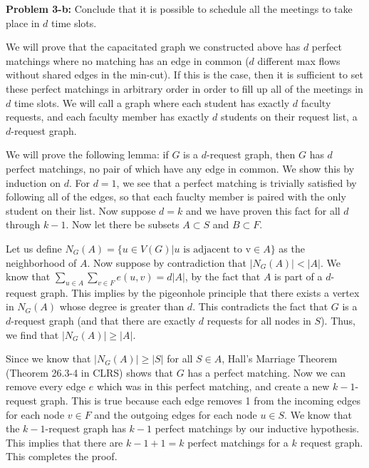 \documentclass[psamsfonts]{amsart}
\newenvironment{sol}{\vspace{0.25cm}{\large \bfseries Solution:}}{\qedsymbol}
\newenvironment{prob}[1]{\begin{framed}{\large \bfseries Problem #1:}}{\end{framed}}
\begin{document}
\begin{prob}{3-b}
Conclude that it is possible to schedule all the meetings to take place in $d$ time slots.
\end{prob}
\begin{sol}
We will prove that the capacitated graph we constructed above has $d$ perfect matchings where no matching has an edge in common ($d$ different max flows without shared edges in the min-cut). If this is the case, then it is sufficient to set these perfect matchings in arbitrary order in order to fill up all of the meetings in $d$ time slots. We will call a graph where each student has exactly $d$ faculty requests, and each faculty member has exactly $d$ students on their request list, a $d$-request graph. 

We will prove the following lemma: if $G$ is a $d$-request graph, then $G$ has $d$ perfect matchings, no pair of which have any edge in common. We show this by induction on $d$. For $d=1$, we see that a perfect matching is trivially satisfied by following all of the edges, so that each fauclty member is paired with the only student on their list. Now suppose $d=k$ and we have proven this fact for all $d$ through $k-1$. Now let there be subsets $A \subset S$ and $B \subset F$.

Let us define $N_G(A) = \{u \in V(G) | u \text{ is adjacent to v}\in A \}$ as the neighborhood of $A$. Now suppose by contradiction that $|N_G(A)| < |A|$. We know that $\sum_{u \in A} \sum_{v \in F} e(u,v) = d |A|$, by the fact that $A$ is part of a $d$-request graph. This implies by the pigeonhole principle that there exists a vertex in $N_G(A)$ whose degree is greater than $d$. This contradicts the fact that $G$ is a $d$-request graph (and that there are exactly $d$ requests for all nodes in $S$). Thus, we find that $|N_G(A)| \geq |A|$.  

Since we know that $|N_G(A)| \geq |S|$ for all $S \in A$, Hall's Marriage Theorem (Theorem 26.3-4 in CLRS) shows that $G$ has a perfect matching. Now we can remove every edge $e$ which was in this perfect matching, and create a new $k-1$-request graph. This is true because each edge removes 1 from the incoming edges for each node $v \in F$ and the outgoing edges for each node $u \in S$. We know that the $k-1$-request graph has $k-1$ perfect matchings by our inductive hypothesis. This implies that there are $k-1 + 1 = k$ perfect matchings for a $k$ request graph. This completes the proof.
\end{sol}
\end{document}
